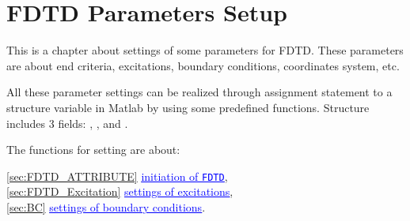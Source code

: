 \chapter{FDTD Parameters Setup}\label{chap:FDTD Parameter Setup}
This is a chapter about  settings of  some parameters for FDTD. These parameters are about end criteria, excitations, boundary conditions, coordinates system, etc.

All these parameter settings can be realized through  assignment statement to a structure variable  in Matlab by using some predefined functions.
Structure   \label{para:FDTD}  includes 3 fields:  
	      , \label{para:ATTRIBUTE}
	      , \label{para:Excitation}
	      and  \label{para:BoundaryCond}.

The functions for setting    are about:
      \begin{myindentpar}
	     \ref{sec:FDTD_ATTRIBUTE} \hspace{1cm} \hyperref[sec:FDTD_ATTRIBUTE]{\textcolor{blue}{\underline{initiation of \texttt{FDTD}}}}, \\
	      \ref{sec:FDTD_Excitation} \hspace{1cm} \hyperref[sec:FDTD_Excitation]{\textcolor{blue}{\underline{settings of  excitations}}},\\
	      \ref{sec:BC} \hspace{1cm} \hyperref[sec:BC]{\textcolor{blue}{\underline{settings of boundary conditions}}}.
       \end{myindentpar}


